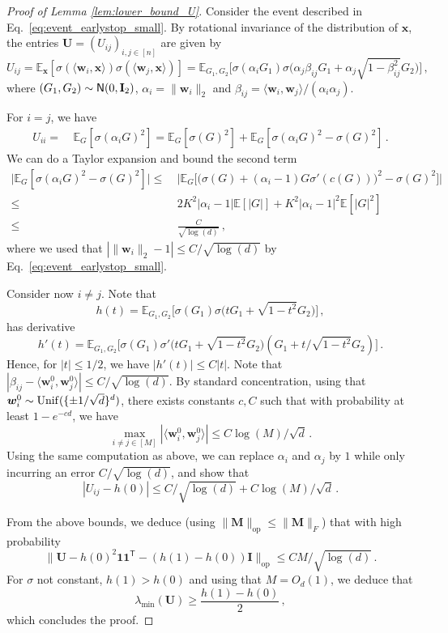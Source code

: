 \documentclass[11pt]{article}
\newcommand{\E}{\mathbb{E}}
\def\id{{\mathbf I}}
\newcommand{\<}{\langle}
\renewcommand{\>}{\rangle}
\def\sT{{\mathsf T}}
\theoremstyle{definition}
\def\bM{{\boldsymbol M}}
\def\bU{{\boldsymbol U}}
\def\bw{{\boldsymbol w}}
\def\bx{{\boldsymbol x}}
\def\Unif{{\rm Unif}}
\def\Unif{{\sf Unif}}
\def\normal{{\sf N}}
\def\normal{{\sf N}}
\def\Unif{{\sf Unif}}
\def\normal{{\sf N}}
\def\bw{{\boldsymbol w}}
\def\bx{{\boldsymbol x}}
\def\Unif{{\rm Unif}}
\def\bU{{\boldsymbol U}}
\def\normal{{\sf N}}
\def\bones{{\boldsymbol 1}}
\def\bU{{\boldsymbol U}}
\begin{document}
\begin{proof}[Proof of Lemma \ref{lem:lower_bound_U}]
    Consider the event described in Eq.~\eqref{eq:event_earlystop_small}. By rotational invariance of the distribution of $\bx$, the entries $\bU = (U_{ij})_{i,j \in [n]}$ are given by
    \[
    U_{ij} = \E_{\bx} [ \sigma ( \< \bw_i, \bx \>) \sigma ( \< \bw_j , \bx \> ) ] = \E_{G_1,G_2} \Big[\sigma ( \alpha_{i} G_1 ) \sigma \Big( \alpha_j \beta_{ij} G_1 + \alpha_j \sqrt{1 - \beta_{ij}^2 } G_2 \Big)   \Big]\, , 
    \]
    where $(G_1,G_2) \sim \normal (0, \id_2)$, $\alpha_i = \| \bw_i\|_2 $ and $\beta_{ij}= \< \bw_i , \bw_j \>/(\alpha_i \alpha_j )$.

    For $i =j$, we have
    \[
    \begin{aligned}
    U_{ii} =&~ \E_G [ \sigma ( \alpha_{i} G )^2] =  \E_G [ \sigma ( G )^2] +  \E_G [ \sigma ( \alpha_{i} G )^2 - \sigma ( G )^2] \, .
    \end{aligned}
    \]
    We can do a Taylor expansion and bound the second term
    \[
    \begin{aligned}
      \big\vert \E_G [ \sigma ( \alpha_{i} G )^2 - \sigma ( G )^2] \big\vert \leq &~ \big\vert \E_G \Big[ \Big( \sigma ( G ) + (\alpha_i - 1)G \sigma' (c(G))\Big)^2 -\sigma ( G )^2 \Big] \big\vert \\
      \leq&~ 2 K^2 \vert \alpha_i - 1 \vert \E [ |G| ] + K^2 \vert \alpha_i - 1 \vert^2 \E [ |G|^2 ] \\
      \leq&~ \frac{C}{\sqrt{\log(d)}}\, ,
    \end{aligned}
    \]
    where we used that $|\| \bw_i \|_2 -1| \leq C /\sqrt{\log (d) }$ by Eq.~\eqref{eq:event_earlystop_small}.

    Consider now $i \neq j$. Note that
    \[
    h(t) = \E_{G_1,G_2} \Big[\sigma ( G_1 ) \sigma \Big( t G_1 + \sqrt{1 - t^2 } G_2 \Big)   \Big]\, ,
    \]
    has derivative
    \[
   h'(t)  = \E_{G_1,G_2} \Big[\sigma ( G_1 ) \sigma ' \Big( t G_1 + \sqrt{1 - t^2 } G_2 \Big)  (G_1 + t/\sqrt{1- t^2} G_2 ) \Big]\, .
    \]
    Hence, for $|t|\leq 1/2$, we have $|h'(t)| \leq C |t|$. Note that $|\beta_{ij} - \< \bw_i^0 , \bw_j^0\>| \leq C/\sqrt{\log(d)}$. By standard concentration, using that $\bw_i^0 \sim \Unif ( \{ \pm 1 / \sqrt{d} \}^d)$, there exists constants $c,C$ such that with probability at least $1 - e^{-cd}$, we have
    \[
    \max_{i\neq j \in [M]} | \< \bw_i^0 , \bw_j^0 \> | \leq C \log(M) / \sqrt{d} \, .
    \]
    Using the same computation as above, we can replace $\alpha_i$ and $\alpha_j$ by $1$ while only incurring an error $C/\sqrt{\log(d)}$, and show that
    \[
    | U_{ij} - h(0) | \leq C/\sqrt{\log(d)} + C \log(M) / \sqrt{d} \, .
    \]

    From the above bounds, we deduce (using $\| \bM \|_{\text{op}} \leq \| \bM\|_F$) that with high probability
    \[
    \| \bU - h(0)^2 \bones \bones^\sT - (h(1) - h(0)) \id \|_{\text{op}} \leq CM /\sqrt{\log(d)}\, .
    \]
    For $\sigma$ not constant, $h(1) > h(0)$ and using that $M = O_d(1)$, we deduce that
    \[
    \lambda_{\min} ( \bU) \geq \frac{h(1) - h(0)}{2}\, , 
    \]
    which concludes the proof.
\end{proof}
\end{document}
